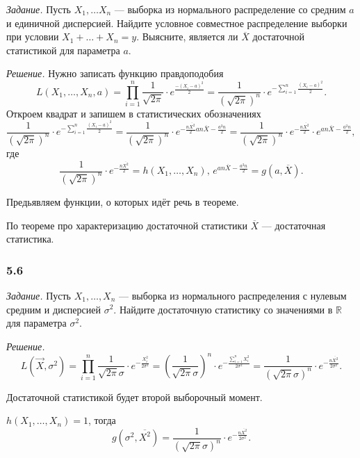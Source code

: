 \textit{Задание.}
Пусть $X_1, \dotsc X_n$ ---
выборка из нормального распределение со средним $a$ и единичной дисперсией.
Найдите условное совместное распределение выборки при условии $X_1 + \dotsc + X_n = y$.
Выясните, является ли $ \overline{X}$ достаточной статистикой для параметра $a$.

\textit{Решение.} Нужно записать функцию правдоподобия
$$L \left( X_1, \dotsc, X_n, a \right) =
  \prod \limits_{i = 1}^n \frac{1}{ \sqrt{2 \pi }} \cdot e^{ \frac{- \left( X_i - a \right)^2}{2}} =
  \frac{1}{ \left( \sqrt{2 \pi } \right)^n} \cdot
  e^{- \sum \limits_{i = 1}^n \frac{ \left( X_i - a \right)^2}{2}}.$$
Откроем квадрат и запишем в статистических обозначениях
$$ \frac{1}{ \left( \sqrt{2 \pi } \right)^n} \cdot
  e^{- \sum \limits_{i = 1}^n \frac{ \left( X_i - a \right)^2}{2}} =
  \frac{1}{ \left( \sqrt{2 \pi } \right)^n} \cdot
  e^{- \frac{n \overline{X^2}}{2} an \overline{X} - \frac{a^2 n}{2}} =
  \frac{1}{ \left( \sqrt{2 \pi } \right)^n} \cdot e^{- \frac{n \overline{X^2}}{2}} \cdot
  e^{an \overline{X} - \frac{a^2 n}{2}},$$
где
$$ \frac{1}{ \left( \sqrt{2 \pi } \right)^n} \cdot e^{- \frac{n \overline{X^2}}{2}} =
  h \left( X_1, \dotsc, X_n \right), \,
  e^{an \overline{X} - \frac{a^2 n}{2}} = g \left( a, \overline{X} \right).$$

Предьявляем функции, о которых идёт речь в теореме.

По теореме про характеризацию достаточной статистики $ \overline{X}$ --- достаточная статистика.

\subsubsection{5.6}

\textit{Задание.}
Пусть $X_1, \dotsc, X_n$ ---
выборка из нормального распределения с нулевым средним и дисперсией $ \sigma^2$.
Найдите достаточную статистику со значениями в $ \mathbb{R}$ для параметра $ \sigma^2$.

\textit{Решение.}
$$L \left( \vec{X}, \sigma^2 \right) =
  \prod \limits_{i = 1}^n \frac{1}{ \sqrt{2 \pi } \sigma } \cdot e^{- \frac{X_i^2}{2 \sigma^2}} =
  \left( \frac{1}{ \sqrt{2 \pi } \sigma } \right)^n \cdot
  e^{- \frac{ \sum \limits_{i = 1}^n X_i^2}{2 \sigma^2}} =
  \frac{1}{ \left( \sqrt{2 \pi } \sigma \right)^n} \cdot
  e^{- \frac{n \overline{X^2}}{2 \sigma^2}}.$$

Достаточной статистикой будет второй выборочный момент.

$h \left( X_1, \dotsc, X_n \right) = 1$, тогда
$$g \left( \sigma^2, \overline{X^2} \right) =
  \frac{1}{ \left( \sqrt{2 \pi } \sigma \right)^n} \cdot
  e^{- \frac{n \overline{X^2}}{2 \sigma^2}}.$$

